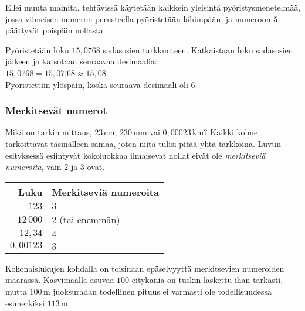 Ellei muuta mainita, tehtävissä käytetään kaikkein yleisintä pyöristysmenetelmää, jossa viimeisen numeron perusteella pyöristetään lähimpään, ja numeroon $5$ päättyvät poispäin nollasta.

\begin{esimerkki}
Pyöristetään luku $15,0768$ sadasosien tarkkuuteen. Katkaistaan luku sadasosien jälkeen ja katsotaan seuraavaa desimaalia:\\
$15,0768 = 15,07|68 \approx 15,08$.\\
Pyöristettiin ylöspäin, koska seuraava desimaali oli 6.
\end{esimerkki}


\subsubsection*{Merkitsevät numerot}

Mikä on tarkin mittaus, $23$\,cm, $230$\,mm vai $0,00023$\,km? Kaikki kolme tarkoittavat täsmälleen samaa, joten niitä tulisi pitää yhtä tarkkoina. Luvun esityksessä esiintyvät kokoluokkaa ilmaisevat nollat eivät ole \emph{merkitseviä numeroita}, vain $2$ ja $3$ ovat.


\begin{center}
\begin{tabular}{r|l}
Luku & Merkitseviä numeroita \\
\hline
$123$ & $3$ \\
$12\,000$ & $2$ (tai enemmän)\\
$12,34$ & $4$ \\
$0,00123$ & $3$
\end{tabular}
\end{center} %


Kokonaislukujen kohdalla on toisinaan epäselvyyttä merkitsevien numeroiden määrässä. Kasvimaalla asuvaa $100$ citykania on tuskin laskettu ihan tarkasti, mutta $100$\,m juoksuradan todellinen pituus ei varmasti ole todellisuudessa esimerkiksi $113$\,m.

